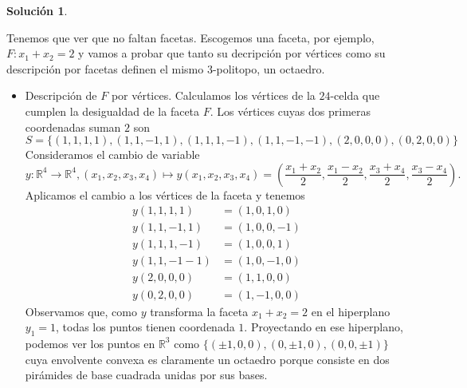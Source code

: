 \documentclass[10pt]{article}
\theoremstyle{definition}
\newtheorem*{sol}{Solución}
\begin{document}
\begin{sol}
\begin{enumerate}[(a)]
    Tenemos que ver que no faltan facetas. Escogemos una faceta, por ejemplo, $F: x_1+x_2=2$ y vamos a probar que tanto su decripción por vértices como su descripción por facetas definen el mismo $3$-politopo, un octaedro.
    \begin{itemize}
        \item Descripción de $F$ por vértices.
        Calculamos los vértices de la $24$-celda que cumplen la desigualdad de la faceta $F$. Los vértices cuyas dos primeras coordenadas suman $2$ son 
        \[S=\{(1,1,1,1),(1,1,-1,1),(1,1,1,-1),(1,1,-1,-1),(2,0,0,0),(0,2,0,0)\}\]
        Consideramos el cambio de variable
        \[
        y:\mathbb{R}^4\longrightarrow \mathbb{R}^4,
        (x_1,x_2,x_3,x_4)\longmapsto y(x_1,x_2,x_3,x_4)=\left(\frac{x_1+x_2}{2},\frac{x_1-x_2}{2},\frac{x_3+x_4}{2},\frac{x_3-x_4}{2}\right).\]
        Aplicamos el cambio a los vértices de la faceta y tenemos
        \begin{align*}
            y(1,1,1,1)  & = (1,0,1,0)\\
            y(1,1,-1,1) & = (1,0,0,-1)\\
            y(1,1,1,-1) & = (1,0,0,1)\\
            y(1,1,-1-1) & = (1,0,-1,0)\\
            y(2,0,0,0)  & = (1,1,0,0)\\
            y(0,2,0,0)  & = (1,-1,0,0)
        \end{align*}
        Observamos que, como $y$ transforma la faceta $x_1+x_2=2$ en el hiperplano $y_1=1$, todas los puntos tienen coordenada $1$. Proyectando en ese hiperplano, podemos ver los puntos en $\mathbb{R}^3$ como $\{(\pm1 ,0,0),(0,\pm 1,0),(0,0,\pm 1)\}$ cuya envolvente convexa es claramente un octaedro porque consiste en dos pirámides de base cuadrada unidas por sus bases.
\begin{center}
\end{center}
        

\end{itemize}
\end{enumerate}
\end{sol}
\end{document}
